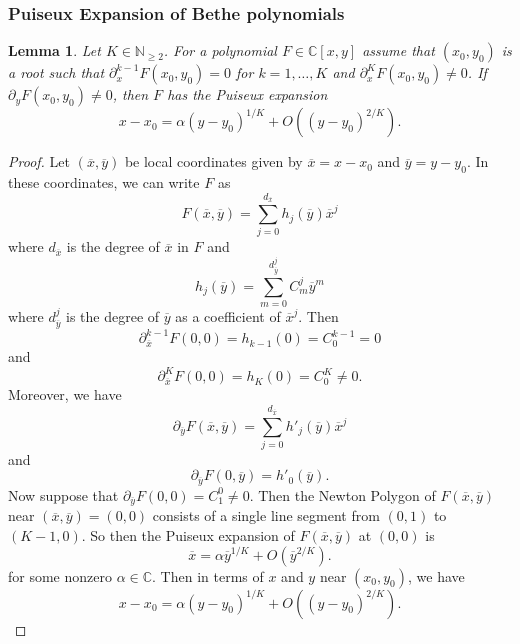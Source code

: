 \documentclass[a4paper,11pt]{article}
\newtheorem{lemma}[theorem]{Lemma}
\theoremstyle{definition}
\begin{document}
\subsubsection{Puiseux Expansion of Bethe polynomials}
\begin{lemma}\label{l: puiseux expansion}
    Let $K\in\mathbb{N}_{\geq 2}$. For a polynomial $F\in\mathbb{C}[x,y]$ assume that $(x_0,y_0)$ is a root such that $\partial_{x}^{k-1}F(x_0,y_0)=0$ for $k=1,\ldots,K$ and $\partial_{x}^{K}F(x_0,y_0)\neq0$. If $\partial_{y}F(x_0,y_0)\neq0$, then $F$ has the Puiseux expansion \begin{equation}
        x-x_0=\alpha(y-y_0)^{1/K}+O\left((y-y_0)^{2/K}\right).
    \end{equation}
\end{lemma}
\begin{proof}
Let $(\overline{x},\overline{y})$ be local coordinates given by $\overline{x}=x-x_0$ and $\overline{y}=y-y_0$. In these coordinates, we can write $F$ as 
\begin{equation}
    F(\overline{x},\overline{y})=\sum_{j=0}^{d_{\overline{x}}}h_j(\overline{y})\overline{x}^j
\end{equation}
where $d_{\overline{x}}$ is the degree of $\overline{x}$ in $F$ and 
\begin{equation}            h_j(\overline{y})=\sum_{m=0}^{d_{\overline{y}}^j}C_m^j\overline{y}^m
\end{equation}
where $d_{\overline{y}}^j$ is the degree of $\overline{y}$ as a coefficient of $\overline{x}^j$. Then \begin{equation}\partial_{\overline{x}}^{k-1}F(0,0)=h_{k-1}(0)=C_{0}^{k-1}=0\end{equation} and \begin{equation}\partial_{\overline{x}}^{K}F(0,0)=h_{K}(0)=C_{0}^{K}\neq0.\end{equation} Moreover, we have \begin{equation}
    \partial_{\overline{y}}F(\overline{x},\overline{y})=\sum_{j=0}^{d_{\overline{x}}}h'_j(\overline{y})\overline{x}^j 
\end{equation}
and 
\begin{equation}
      \partial_{\overline{y}}F(0,\overline{y})=h'_0(\overline{y}).
\end{equation}
Now suppose that $\partial_{\overline{y}}F(0,0)=C_1^0\neq0$. Then the Newton Polygon of $F(\overline{x},\overline{y})$ near $(\overline{x},\overline{y})=(0,0)$ consists of a single line segment from $(0,1)$ to $(K-1,0)$. So then the Puiseux expansion \cite{Casas-Alvero_2000} of $F(\overline{x},\overline{y})$ at $(0,0)$ is \begin{equation}
    \overline{x}=\alpha  \overline{y}^{1/K} +O\left(\overline{y}^{2/K}\right). 
\end{equation}
for some nonzero $\alpha\in\mathbb{C}$.
Then in terms of $x$ and $y$ near $(x_0,y_0)$, we have \begin{equation}
    x-x_0=\alpha (y-y_0)^{1/K}+O\left((y-y_0)^{2/K}\right).
\end{equation}
\end{proof}
\end{document}
